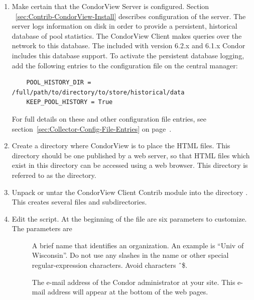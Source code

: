 \begin{enumerate}

\item Make certain that the CondorView Server is configured.
Section ~\ref{sec:Contrib-CondorView-Install}
describes configuration of the server.
The server logs information on disk in order to provide a persistent,
historical database of pool statistics.
The CondorView Client makes queries over the network to this
database.  The  included with version 6.2.x and 6.1.x
Condor includes this database support.
To activate the persistent database logging, add the following entries to
the configuration file on the central manager: 
\begin{verbatim}
    POOL_HISTORY_DIR = /full/path/to/directory/to/store/historical/data 
    KEEP_POOL_HISTORY = True 
\end{verbatim}
For full details on these and other  configuration file
entries, see section~\ref{sec:Collector-Config-File-Entries} on
page~\pageref{sec:Collector-Config-File-Entries}.

\item Create a directory where CondorView is to place the HTML files.  
This directory should be one published by a web server, so that HTML
files which exist in this directory can be accessed using a web browser.  
This directory is referred to as the  directory.

\item Unpack or untar the CondorView Client Contrib module into the
directory .
This creates several files and subdirectories.

\item Edit the \MakeStats script.  At the beginning of the file
are six parameters to customize.
The parameters are

        \begin{description}

	\item[] A brief name that identifies an
	organization. An example is ``Univ of Wisconsin''.  Do not
	use any slashes in the name or other special regular-expression
	characters. Avoid characters \Bs \^\ \$.

	\item[] The e-mail
	address of the Condor administrator at your site.  
	This e-mail address will appear at the bottom of the web pages.


\end{description}
\end{enumerate}
